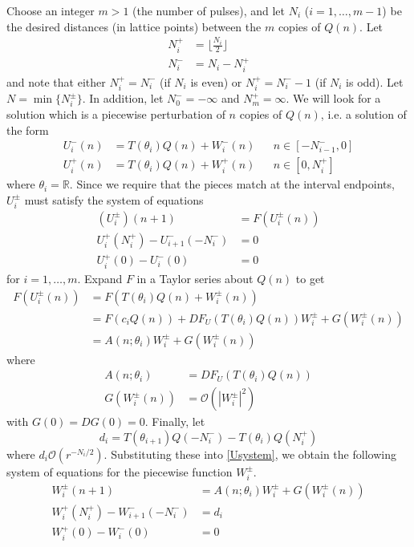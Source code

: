 \documentclass[12pt]{article}
\def\R{{\mathbb R}}
\begin{document}
Choose an integer $m > 1$ (the number of pulses), and let $N_i$ ($i = 1, \dots, m-1$) be the desired distances (in lattice points) between the $m$ copies of $Q(n)$. Let 
\begin{equation}\label{Nipm}
\begin{aligned}
N_i^+ &= \lfloor \frac{N_i}{2} \rfloor \\
N_i^- &= N_i - N_i^+
\end{aligned}
\end{equation}
and note that either $N_i^+ = N_i^-$ (if $N_i$ is even) or $N_i^+ = N_i^- - 1$ (if $N_i$ is odd). Let $N = \min\{ N_i^\pm \}$. In addition, let $N_0^- = -\infty$ and $N_m^+ = \infty$. We will look for a solution which is a piecewise perturbation of $n$ copies of $Q(n)$, i.e. a solution of the form
\begin{align}\label{Upiecewise}
U_i^-(n) &= T(\theta_i) Q(n) + W_i^-(n) && n \in [-N_{i-1}^-, 0] \\
U_i^+(n) &= T(\theta_i) Q(n) + W_i^+(n) && n \in [0, N_i^+]
\end{align}
where $\theta_i = \R$. Since we require that the pieces match at the interval endpoints, $U_i^\pm$ must satisfy the system of equations
\begin{equation}\label{Usystem}
\begin{aligned}
(U_i^\pm)(n+1) &= F(U_i^\pm(n))  \\
U_i^+(N_i^+) - U_{i+1}^-(-N_i^-) &= 0 \\
U_i^+(0) - U_i^-(0) &= 0
\end{aligned}
\end{equation}
for $i = 1, \dots, m$. Expand $F$ in a Taylor series about $Q(n)$ to get
\begin{align*}
F(U_i^\pm(n)) &= F(T(\theta_i) Q(n) + W_i^\pm(n)) \\
&= F(c_i Q(n)) + DF_{U}(T(\theta_i) Q(n)) W_i^\pm + G(W_i^\pm(n)) \\
&= A(n; \theta_i) W_i^\pm + G(W_i^\pm(n))
\end{align*}
where
\begin{align*}
A(n; \theta_i) &= DF_{U}(T(\theta_i) Q(n))\\
G(W_i^\pm(n)) &= \mathcal{O}(|W_i^\pm|^2)
\end{align*}
with $G(0) = DG(0) = 0$. Finally, let 
\begin{equation}\label{defdi}
d_i = T(\theta_{i+1}) Q(-N_i^-) - T(\theta_i) Q(N_i^+)
\end{equation}
where $d_i \mathcal{O}(r^{-N_i/2})$. Substituting these into \eqref{Usystem}, we obtain the following system of equations for the piecewise function $W_i^\pm$.
\begin{align}
W_i^\pm(n+1) &= A(n; \theta_i) W_i^\pm + G(W_i^\pm(n)) \label{Wsystem1} \\
W_i^+(N_i^+) - W_{i+1}^-(-N_i^-) &= d_i \label{Wsystem2} \\
W_i^+(0) - W_i^-(0) &= 0 \label{Wsystem3} \\
\end{align}
\end{document}
